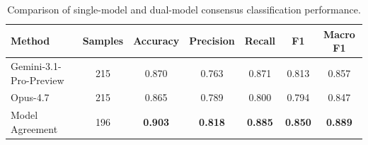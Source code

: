 \begin{table}[t]
    \centering
    \caption{Comparison of single-model and dual-model consensus classification performance.}
    \label{tab:model_consistency_results}
    \begin{tabular}{lcccccc}
        \toprule
        Method & Samples & Accuracy & Precision & Recall & F1& Macro F1 \\
        \midrule
        Gemini-3.1-Pro-Preview
        & 215 & 0.870 & 0.763 & 0.871 & 0.813 & 0.857 \\

        Opus-4.7
        & 215 & 0.865 & 0.789 & 0.800 & 0.794 & 0.847 \\

        Model Agreement
        & 196 & \textbf{0.903} & \textbf{0.818} &
        \textbf{0.885} & \textbf{0.850} & \textbf{0.889} \\
        \bottomrule
    \end{tabular}
\end{table}

